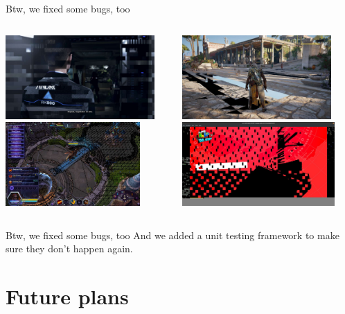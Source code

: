 \documentclass[aspectratio=169,t,xcolor=table]{beamer}
\begin{document}
\begin{frame}{Btw, we fixed some bugs, too}
    \begin{columns}
        \includegraphics[height=3.2cm]{figs/bug1.jpg}
        \includegraphics[height=3.2cm]{figs/bug2.jpg}

        \includegraphics[height=3.2cm]{figs/bug3.jpg}
        \includegraphics[height=3.2cm]{figs/bug4.jpg}
    \end{columns}
\end{frame}

\begin{frame}{Btw, we fixed some bugs, too}
    \LARGE
    And we added a unit testing framework to make sure they don't happen again.
\end{frame}

\section{Future plans}
\end{document}
